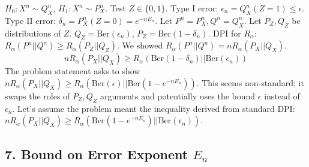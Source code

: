 \documentclass{article}
\begin{document}
$H_0: X^n \sim Q_X^n$, $H_1: X^n \sim P_X^n$. Test $Z \in \{0, 1\}$.
Type I error: $\epsilon_n = Q_X^n(Z=1) \le \epsilon$. Type II error: $\delta_n = P_X^n(Z=0) = e^{-n E_n}$.
Let $P^n=P_X^n, Q^n=Q_X^n$. Let $P_Z, Q_Z$ be distributions of $Z$. $Q_Z = \text{Ber}(\epsilon_n)$, $P_Z = \text{Ber}(1-\delta_n)$.
DPI for $R_\alpha$: $R_\alpha(P^n||Q^n) \ge R_\alpha(P_Z||Q_Z)$.
We showed $R_\alpha(P^n||Q^n) = n R_\alpha(P_X||Q_X)$.
\[ n R_\alpha(P_X||Q_X) \ge R_\alpha(\text{Ber}(1-\delta_n)||\text{Ber}(\epsilon_n)) \]
The problem statement asks to show $n R_\alpha(P_X||Q_X) \ge R_\alpha(\text{Ber}(\epsilon)||\text{Ber}(1 - e^{-nE_n}))$. This seems non-standard; it swaps the roles of $P_Z, Q_Z$ arguments and potentially uses the bound $\epsilon$ instead of $\epsilon_n$. Let's assume the problem meant the inequality derived from standard DPI: $n R_\alpha(P_X||Q_X) \ge R_\alpha(\text{Ber}(1-e^{-n E_n})||\text{Ber}(\epsilon_n))$.

\subsection*{7. Bound on Error Exponent $E_n$}
\end{document}
